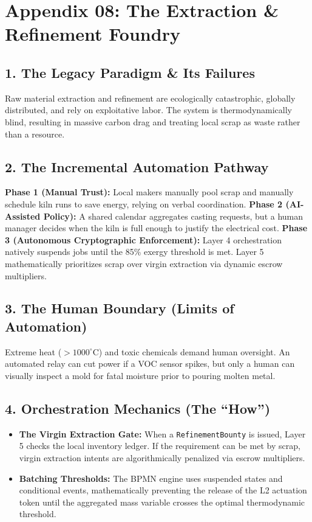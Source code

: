 \chapter*{Appendix 08: The Extraction \& Refinement Foundry}

\section*{1. The Legacy Paradigm \& Its Failures}
Raw material extraction and refinement are ecologically catastrophic, globally distributed, and rely on exploitative labor. The system is thermodynamically blind, resulting in massive carbon drag and treating local scrap as waste rather than a resource.

\section*{2. The Incremental Automation Pathway}
\textbf{Phase 1 (Manual Trust):} Local makers manually pool scrap and manually schedule kiln runs to save energy, relying on verbal coordination.
\textbf{Phase 2 (AI-Assisted Policy):} A shared calendar aggregates casting requests, but a human manager decides when the kiln is full enough to justify the electrical cost.
\textbf{Phase 3 (Autonomous Cryptographic Enforcement):} Layer 4 orchestration natively suspends jobs until the 85\% exergy threshold is met. Layer 5 mathematically prioritizes scrap over virgin extraction via dynamic escrow multipliers.

\section*{3. The Human Boundary (Limits of Automation)}
Extreme heat ($>1000^\circ\text{C}$) and toxic chemicals demand human oversight. An automated relay can cut power if a VOC sensor spikes, but only a human can visually inspect a mold for fatal moisture prior to pouring molten metal.

\section*{4. Orchestration Mechanics (The ``How'')}
\begin{itemize}
    \item \textbf{The Virgin Extraction Gate:} When a \texttt{RefinementBounty} is issued, Layer 5 checks the local inventory ledger. If the requirement can be met by scrap, virgin extraction intents are algorithmically penalized via escrow multipliers.
    \item \textbf{Batching Thresholds:} The BPMN engine uses suspended states and conditional events, mathematically preventing the release of the L2 actuation token until the aggregated mass variable crosses the optimal thermodynamic threshold.
\end{itemize}
